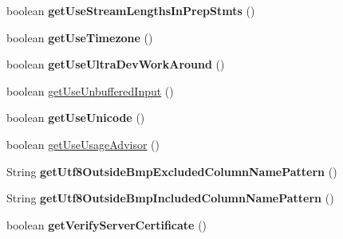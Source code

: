 \begin{DoxyCompactItemize}
boolean {\bfseries get\+Use\+Stream\+Lengths\+In\+Prep\+Stmts} ()
\item 
\mbox{\label{classcom_1_1mysql_1_1jdbc_1_1_multi_host_my_s_q_l_connection_a77a448fba5df170b08a2722317116746}} 
boolean {\bfseries get\+Use\+Timezone} ()
\item 
\mbox{\label{classcom_1_1mysql_1_1jdbc_1_1_multi_host_my_s_q_l_connection_a0b1453e08466ad1d99573ce43366d075}} 
boolean {\bfseries get\+Use\+Ultra\+Dev\+Work\+Around} ()
\item 
boolean \mbox{\hyperlink{classcom_1_1mysql_1_1jdbc_1_1_multi_host_my_s_q_l_connection_a4d1dd6152a4a012bf93be333f0e98aba}{get\+Use\+Unbuffered\+Input}} ()
\item 
\mbox{\label{classcom_1_1mysql_1_1jdbc_1_1_multi_host_my_s_q_l_connection_aee0a55010673e6abbfc5886ca2611641}} 
boolean {\bfseries get\+Use\+Unicode} ()
\item 
boolean \mbox{\hyperlink{classcom_1_1mysql_1_1jdbc_1_1_multi_host_my_s_q_l_connection_a713344936008f7ef2eefecaec2aa5754}{get\+Use\+Usage\+Advisor}} ()
\item 
\mbox{\label{classcom_1_1mysql_1_1jdbc_1_1_multi_host_my_s_q_l_connection_a2bdd3163d836f78b5a3977574ecedf24}} 
String {\bfseries get\+Utf8\+Outside\+Bmp\+Excluded\+Column\+Name\+Pattern} ()
\item 
\mbox{\label{classcom_1_1mysql_1_1jdbc_1_1_multi_host_my_s_q_l_connection_a4854481d569dab1e51fbe9c83c54db23}} 
String {\bfseries get\+Utf8\+Outside\+Bmp\+Included\+Column\+Name\+Pattern} ()
\item 
\mbox{\label{classcom_1_1mysql_1_1jdbc_1_1_multi_host_my_s_q_l_connection_af01a08a7ba242967eac1b5fa96f196a7}} 
boolean {\bfseries get\+Verify\+Server\+Certificate} ()
\item 
\mbox{\label{classcom_1_1mysql_1_1jdbc_1_1_multi_host_my_s_q_l_connection_a5823064128e71a051b1f28248c571c25}} 

\end{DoxyCompactItemize}
